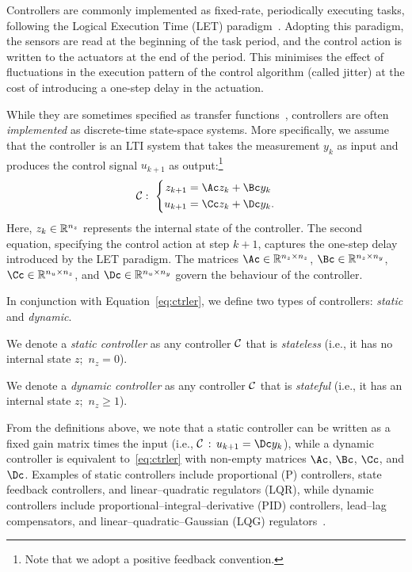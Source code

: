Controllers are commonly implemented as fixed-rate, periodically executing tasks, following the Logical Execution Time (LET) paradigm~\cite{Henzinger:2003,Kirsch:2012, Ernst:2018}.
Adopting this paradigm, the sensors are read at the beginning of the task period, and the control action is written to the actuators at the end of the period. 
This minimises the effect of fluctuations in the execution pattern of the control algorithm (called jitter) at the cost of introducing a one-step delay in the actuation.

While they are sometimes specified as transfer functions~\cite{Astrom:2008}, controllers are often \emph{implemented} as discrete-time state-space systems.
More specifically, we assume that the controller is an LTI system that takes the measurement $y_k$ as input and produces the control signal $u_{k+1}$ as output:\footnote{Note that we adopt a positive feedback convention.}
\begin{equation}
    \label{eq:ctrler}
    \ctrler: \,\, \left\{
    \begin{aligned}
        z_{k+1} &= \Ac z_k + \Bc y_k \\
        u_{k+1} &= \Cc z_{k} + \Dc y_k.
    \end{aligned}
    \right.
\end{equation}
Here, $z_k \in \mathbb{R}^{n_z}$ represents the internal state of the controller.
The second equation, specifying the control action at step $k+1$, captures the one-step delay introduced by the LET paradigm.
The matrices $\Ac \in \R^{n_z \times n_z}$, $\Bc \in \R^{n_z \times n_y}$, $\Cc \in \R^{n_u \times n_z}$, and $\Dc \in \R^{n_u \times n_y}$ govern the behaviour of the controller.

In conjunction with Equation~\eqref{eq:ctrler}, we define two types of controllers: \emph{static} and \emph{dynamic}.

\begin{definition}
    We denote a \emph{static controller} as any controller $\mathcal{C}$ that is \emph{stateless} (i.e., it has no internal state $z$;\, $n_z = 0$).
\end{definition}

\begin{definition}
    We denote a \emph{dynamic controller} as any controller $\mathcal{C}$ that is \emph{stateful} (i.e., it has an internal state $z$;\, $n_z\geq 1$).
\end{definition}

From the definitions above, we note that a static controller can be written as a fixed gain matrix times the input (i.e., $\ctrler \,:\, u_{k+1} = \Dc y_k$), while a dynamic controller is equivalent to~\eqref{eq:ctrler} with non-empty matrices $\Ac$, $\Bc$, $\Cc$, and $\Dc$.
Examples of static controllers include proportional (P) controllers, state feedback controllers, and linear--quadratic regulators (LQR), while dynamic controllers include proportional--integral--derivative (PID) controllers, lead--lag compensators, and linear--quadratic--Gaussian (LQG) regulators~\cite{Astrom:2008}.

